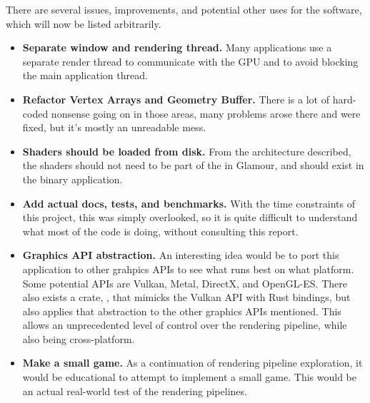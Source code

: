 There are several issues, improvements, and potential other uses for the software, which will now be listed arbitrarily.

\begin{itemize}
  \item \textbf{Separate window and rendering thread.} Many applications use a separate render thread to communicate with the GPU and to avoid blocking the main application thread.
  \item \textbf{Refactor Vertex Arrays and Geometry Buffer.} There is a lot of hard-coded nonsense going on in those areas, many problems arose there and were fixed, but it's mostly an unreadable mess.
  \item \textbf{Shaders should be loaded from disk.} From the architecture described, the shaders should not need to be part of the  in Glamour, and should exist in the binary application.
  \item \textbf{Add actual docs, tests, and benchmarks.} With the time constraints of this project, this was simply overlooked, so it is quite difficult to understand what most of the code is doing, without consulting this report.
  \item \textbf{Graphics API abstraction.} An interesting idea would be to port this application to other grahpics APIs to see what runs best on what platform. Some potential APIs are Vulkan, Metal, DirectX, and OpenGL-ES. There also exists a crate, , that mimicks the Vulkan API with Rust bindings, but also applies that abstraction to the other graphics APIs mentioned. This allows an unprecedented level of control over the rendering pipeline, while also being cross-platform.
  \item \textbf{Make a small game.} As a continuation of rendering pipeline exploration, it would be educational to attempt to implement a small game. This would be an actual real-world test of the rendering pipelines.
\end{itemize}

\newpage


\printbibliography[heading=bibintoc]{}

\newpage


